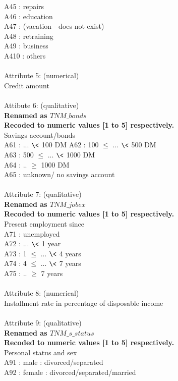 \documentclass{article}\usepackage[]{graphicx}\usepackage[]{color}
\begin{document}
A45 : repairs\\
A46 : education\\
A47 : (vacation - does not exist\?)\\
A48 : retraining\\
A49 : business\\
A410 : others\\
\\
Attribute 5: (numerical)\\
Credit amount\\
\\
Attibute 6: (qualitative)\\
\textbf{Renamed as \textit{$TNM\_ bonds$}}\\
\textbf{Recoded to numeric values [1 to 5] respectively.}\\
Savings account/bonds\\
A61 : ... $\<$ 100 DM
A62 : 100 $\leq$ ... $\<$ 500 DM\\
A63 : 500 $\leq$ ... $\<$ 1000 DM\\
A64 : .. $\geq$ 1000 DM\\
A65 : unknown/ no savings account\\
\\
Attribute 7: (qualitative)\\
\textbf{Renamed as \textit{$TNM\_ jobex$}}\\
\textbf{Recoded to numeric values [1 to 5] respectively.}\\
Present employment since\\
A71 : unemployed\\
A72 : ... $\<$ 1 year\\
A73 : 1 $\leq$ ... $\<$ 4 years\\
A74 : 4 $\leq$ ... $\<$ 7 years\\
A75 : .. $\geq$ 7 years\\
\\
Attribute 8: (numerical)\\
Installment rate in percentage of disposable income\\
\\
Attribute 9: (qualitative)\\
\textbf{Renamed as \textit{$TNM\_ s\_ status$}}\\
\textbf{Recoded to numeric values [1 to 5] respectively.}\\
Personal status and sex\\
A91 : male : divorced/separated\\
A92 : female : divorced/separated/married\\
\end{document}
